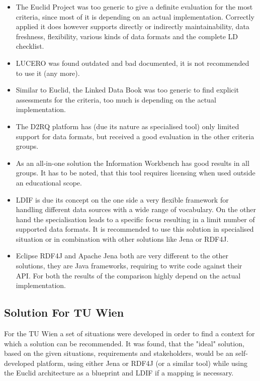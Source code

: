 \begin{itemize}

\item The Euclid Project was too generic to give a definite evaluation for the most criteria, since most of it is depending on an actual implementation. Correctly applied it does however supports directly or indirectly maintainability, data freshness, flexibility, various kinds of data formats and the complete LD checklist.

\item LUCERO was found outdated and bad documented, it is not recommended to use it (any more).

\item Similar to Euclid, the Linked Data Book was too generic to find explicit assessments for the criteria, too much is depending on the actual implementation.

\item The D2RQ platform has (due its nature as specialised tool) only limited support for data formats, but received a good evaluation in the other criteria groups.

\item As an all-in-one solution the Information Workbench has good results in all groups. It has to be noted, that this tool requires licensing when used outside an educational scope.

\item LDIF is due its concept on the one side a very flexible framework for handling different data sources with a wide range of vocabulary. On the other hand the specialisation leads to a specific focus resulting in a limit number of supported data formats. It is recommended to use this solution in specialised situation or in combination with other solutions like Jena or RDF4J.

\item Eclipse RDF4J and Apache Jena both are very different to the other solutions, they are Java frameworks, requiring to write code against their API. For both the results of the comparison highly depend on the actual implementation.
\end{itemize}

\subsection{Solution For TU Wien}

For the TU Wien a set of situations were developed in order to find a context for which a solution can be recommended. It was found, that the "ideal" solution, based on the given situations, requirements and stakeholders, would be an self-developed platform, using either Jena or RDF4J (or a similar tool) while using the Euclid architecture as a blueprint and LDIF if a mapping is necessary.

